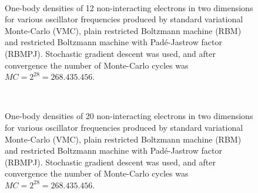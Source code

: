 \begin{figure} [H]%
	\centering
	\\
	
	\caption{One-body densities of 12 non-interacting electrons in two dimensions for various oscillator frequencies produced by standard variational Monte-Carlo (VMC), plain restricted Boltzmann machine (RBM) and restricted Boltzmann machine with Padé-Jastrow factor (RBMPJ). Stochastic gradient descent was used, and after convergence the number of Monte-Carlo cycles was $MC=2^{28}=268.435.456$.}%
	\label{fig:OB_interaction_12P_2D}
\end{figure}

\begin{figure} [H]%
	\centering
	\\
	
	\caption{One-body densities of 20 non-interacting electrons in two dimensions for various oscillator frequencies produced by standard variational Monte-Carlo (VMC), plain restricted Boltzmann machine (RBM) and restricted Boltzmann machine with Padé-Jastrow factor (RBMPJ). Stochastic gradient descent was used, and after convergence the number of Monte-Carlo cycles was $MC=2^{28}=268.435.456$.}%
	\label{fig:OB_interaction_20P_2D}
\end{figure}

